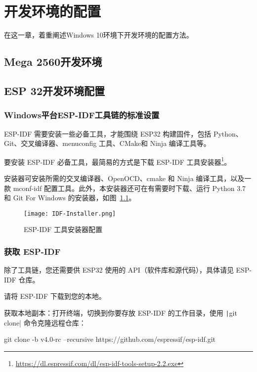\chapter{开发环境的配置}
\label{cha:Environment}

在这一章，着重阐述Windows 10环境下开发环境的配置方法。

\section{Mega 2560开发环境}


\section{ESP 32开发环境配置}

\subsection{Windows平台ESP-IDF工具链的标准设置}

ESP-IDF 需要安装一些必备工具，才能围绕 ESP32 构建固件，包括 Python、Git、交叉编译器、menuconfig 工具、CMake和 Ninja 编译工具等。

要安装 ESP-IDF 必备工具，最简易的方式是下载 ESP-IDF 工具安装器\footnote{\url{https://dl.espressif.com/dl/esp-idf-tools-setup-2.2.exe}}。

安装器可安装所需的交叉编译器、OpenOCD、cmake 和 Ninja 编译工具，以及一款 mconf-idf 配置工具。此外，本安装器还可在有需要时下载、运行 Python 3.7 和 Git For Windows 的安装器，如图~\ref{fig:IDF-Installer}。

\begin{figure}[htbp]
    \centering
    \texttt{[image: IDF-Installer.png]}
    \caption{ESP-IDF 工具安装器配置}
    \label{fig:IDF-Installer}
\end{figure}

\subsection{获取 ESP-IDF}

除了工具链，您还需要供 ESP32 使用的 API（软件库和源代码），具体请见 ESP-IDF 仓库。

请将 ESP-IDF 下载到您的本地。

获取本地副本：打开终端，切换到你要存放 ESP-IDF 的工作目录，使用 \texttt|git clone| 命令克隆远程仓库：

\begin{tcolorbox}
    git clone -b v4.0-rc --recursive https://github.com/espressif/esp-idf.git
\end{tcolorbox}

